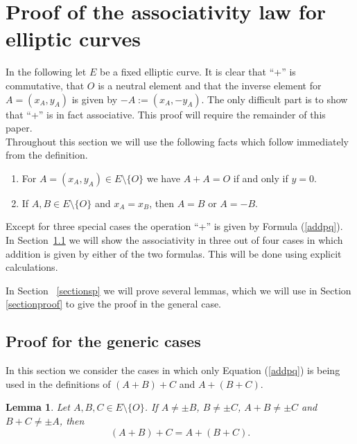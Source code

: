 \documentclass[12pt]{amsart}
\theoremstyle{plain}
\newtheorem{lemma}[theorem]{Lemma}
\theoremstyle{remark}
\theoremstyle{definition}
\def\sm{\setminus}
\def\bn{\begin{enumerate}}
\def\en{\end{enumerate}}
\begin{document}
\section{Proof of the associativity law for elliptic curves}
In the following let  $E$ be a fixed elliptic curve.
It is clear that ``+'' is commutative, that $O$ is a neutral element and that
the inverse element for $A=(x_A,y_A)$ is given by $-A:=(x_A,-y_A)$.
The only difficult part is to show that ``+'' is in fact associative.
This proof will require the remainder of this paper.
\\


Throughout this section we will use the following facts which follow immediately from the definition.
\bn
\item For  $A=(x_A,y_A) \in E \setminus \{O\}$ we have  $A+A=O$ if and only if  $y=0$.
\item If $A,B \in E \sm \{O\}$ and $x_A=x_B$, then $A=B$ or $A=-B$.
\en

Except for three special cases the operation ``+'' is given by
Formula  (\ref{addpq}).
In Section~\ref{section31} we will show the associativity in three out of four cases in which
addition is given by either of the two formulas.
This will be done using explicit calculations.

In Section ~\ref{sectionsp} we will prove several lemmas, which we will use in Section
\ref{sectionproof} to give the proof in the general case.

\subsection{Proof for the generic cases} \label{section31}

In this section we consider the cases in which only Equation (\ref{addpq}) is being
used in the definitions of $(A+B)+C$ and $A+(B+C)$.

\begin{lemma} \label{claimabc}
Let $A,B,C \in E \setminus \{O\}$.
If     $A \neq \pm B$, $B \neq \pm C$, $A+B \neq \pm C$
and $B+C \neq \pm A$,
then
\[ (A+B)+C=A+(B+C). \]
\end{lemma}
\end{document}
